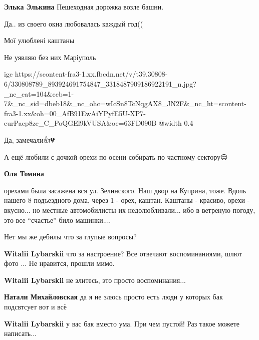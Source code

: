 \begin{itemize} %
\textbf{Элька Элькина} Пешеходная дорожка возле башни.
\end{itemize} %


Да.. из своего окна любовалась каждый год((


Мої улюблені каштаны 🌰 🌰 🌰

Не уявляю без них Маріуполь

\ifcmt
  igc https://scontent-fra3-1.xx.fbcdn.net/v/t39.30808-6/330808789_893924691754847_3318487909186922191_n.jpg?_nc_cat=104&ccb=1-7&_nc_sid=dbeb18&_nc_ohc=wIcSn8TcNqgAX8_JN2F&_nc_ht=scontent-fra3-1.xx&oh=00_AfB91EwAiYPyfE5U-XP7-eurPaep8ze_C_PoQGEl9kVUSA&oe=63FD090B
	@width 0.4
\fi


Да, замечали👍💔

А ещё любили с дочкой орехи по осени собирать по частному сектору😔

\begin{itemize} %
\textbf{Оля Томина} 

орехами была засажена вся ул. Зелинского. Наш двор на Куприна, тоже. Вдоль нашего 8
подъездного дома, через 1 - орех, каштан. Каштаны - красиво, орехи -
вкусно... но местные автомобилисты их недолюбливали... ибо в ветреную погоду,
это все \enquote{счастье} било машинки....

\end{itemize} %


Нет мы же дебилы что за глупые вопросы?

\begin{itemize} %
\textbf{Witalii Lybarskii} что за настроение? Все отвечают воспоминаниями, шлют фото ... Не нравится, прошли мимо.

\textbf{Witalii Lybarskii} не злитесь, это просто воспоминания...

\textbf{Натали Михайловская} да я не злюсь просто есть люди у которых бак подсвтсует вот и всё

\textbf{Witalii Lybarskii} у вас бак вместо ума. При чем пустой! Раз такое можете написать...
\end{itemize} %


